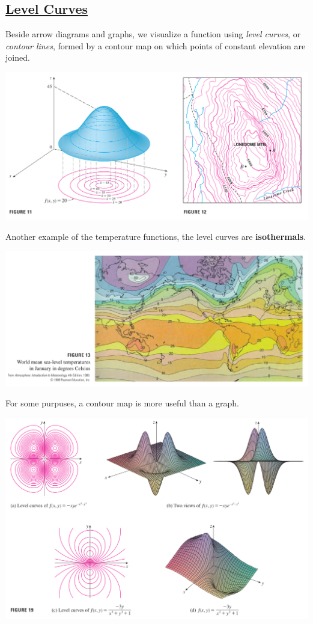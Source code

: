 \documentclass{article}
\begin{document}
\subsection*{{\selectfont \underline{Level Curves}}}
Beside arrow diagrams and graphs, we visualize a function using \textit{level curves}, or \textit{contour lines}, formed by a contour map on which points of constant elevation are joined.
\begin{center}
  \includegraphics[width = 15 cm]{./images/contour.png} 
\end{center}
Another example of the temperature functions, the level curves are \textbf{isothermals}.
\begin{center}
  \includegraphics[width = 13.1 cm]{./images/temperature.png} 
\end{center}

For some purpuses, a contour map is more useful than a graph.
\begin{center}
  \includegraphics[width = 16 cm]{./images/levelcurves.png} 
\end{center}
\end{document}
